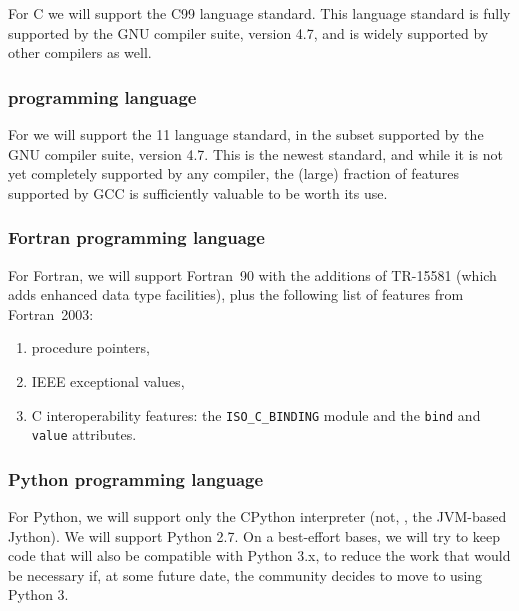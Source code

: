 \documentclass[draftmode,draftwater]{memarticle}
\begin{document}
For C we will support the C99 language standard. This language standard
is fully supported by the GNU compiler suite, version 4.7, and is widely
supported by other compilers as well.

\subsubsection{\cpp{} programming language}

For \cpp{} we will support the \cpp{}11 language standard, in the subset
supported by the GNU compiler suite, version 4.7. This is the newest
\cpp{} standard, and while it is not yet completely supported by any
compiler, the (large) fraction of features supported by GCC is
sufficiently valuable to be worth its use.

\subsubsection{Fortran programming language}

For Fortran, we will support Fortran~90 with the additions of TR-15581
(which adds enhanced data type facilities), plus the following list of
features from Fortran~2003:
\begin{enumerate}
\item procedure pointers,
\item IEEE exceptional values,
\item C interoperability features: the \texttt{ISO\_C\_BINDING} module
  and the \texttt{bind} and \texttt{value} attributes.
\end{enumerate}

\subsubsection{Python programming language}

For Python, we will support only the CPython interpreter (not, \eg, the
JVM-based Jython). We will support Python 2.7. On a best-effort bases,
we will try to keep code that will also be compatible with Python 3.x,
to reduce the work that would be necessary if, at some future date, the
community decides to move to using Python 3.


\end{document}

